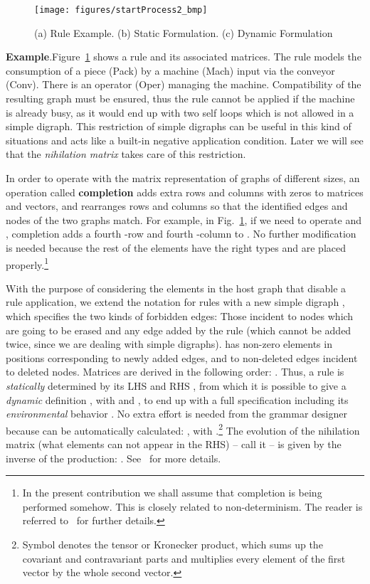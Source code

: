 \documentclass{fundam}
\newcommand{\proofend}{\hfill}
\begin{document}
\begin{figure}[htbp]
  \centering
  \texttt{[image: figures/startProcess2\_bmp]}
  \caption{(a) Rule Example. (b) Static Formulation. (c) Dynamic
    Formulation}
  \label{fig:example_rule}
\end{figure}

\noindent \textbf{Example}.Figure~\ref{fig:example_rule}
shows a rule and its associated matrices. The rule models the
consumption of a piece (Pack) by a machine (Mach) input via the
conveyor (Conv). There is an operator (Oper) managing the
machine. Compatibility of the resulting graph must be ensured, thus
the rule cannot be applied if the machine is already busy, as it would
end up with two self loops which is not allowed in a simple digraph.
This restriction of simple digraphs can be useful in this kind of
situations and acts like a built-in negative application
condition. Later we will see that the \emph{nihilation matrix} takes
care of this restriction. \proofend

In order to operate with the matrix representation of graphs of
different sizes, an operation called \textbf{completion} adds extra
rows and columns with zeros to matrices and vectors, and rearranges
rows and columns so that the identified edges and nodes of the two
graphs match.  For example, in Fig.~\ref{fig:example_rule}, if we need
to operate  and , completion adds a fourth -row and
fourth -column to . No further modification is needed because
the rest of the elements have the right types and are placed
properly.\footnote{In the present contribution we shall assume that
  completion is being performed somehow. This is closely related to
non-determinism. The reader is referred to~\cite{MGGmodel} for further
details.}

With the purpose of considering the elements in the host graph that
disable a rule application, we extend the notation for rules with a
new simple digraph , which specifies the two kinds of forbidden
edges: Those incident to nodes which are going to be erased and any
edge added by the rule (which cannot be added twice, since we are
dealing with simple digraphs).  has non-zero elements in positions
corresponding to newly added edges, and to non-deleted edges incident
to deleted nodes. Matrices are derived in the following order: .  Thus, a rule
is \emph{statically} determined by its LHS and RHS , from which it is possible to give a \emph{dynamic}
definition , with  and
, to end up with a full specification including its
\emph{environmental} behavior .  No
extra effort is needed from the grammar designer because  can be
automatically calculated: , with .\footnote{Symbol
   denotes the tensor or Kronecker product, which sums up the
  covariant and contravariant parts and multiplies every element of
  the first vector by the whole second vector.} The evolution of the
nihilation matrix (what elements can not appear in the RHS) -- call it
 -- is given by the inverse of the production: . See~\cite{MGGfundamenta} for more details.
\end{document}
